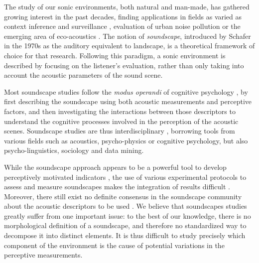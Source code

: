 \documentclass[twoside,twocolumn]{article}
\begin{document}




The study of our sonic environments, both natural and man-made, has gathered growing interest in the past decades, finding applications in fields as varied as context inference and surveillance \cite{heittola13,1540194,park14}, evaluation of urban noise pollution \cite{raimbault_urban_2005} or the emerging area of eco-acoustics \cite{ECOACOUSTICS2014, krause}. The notion of \emph{soundscape}, introduced by Schafer \cite{schafer_new_1969, schafer1977tuning} in the 1970s as the auditory equivalent to landscape, is a theoretical framework of choice for that research. Following this paradigm, a sonic environment is described by focusing on the listener's evaluation, rather than only taking into account the acoustic parameters of the sound scene. 

Most soundscape studies follow the \emph{modus operandi} of cognitive psychology \cite{maffiolo_caracterisation_1999}, by first describing the soundscape using both acoustic measurements and perceptive factors, and then investigating the interactions between those descriptors to understand the cognitive processes involved in the perception of the acoustic scenes. Soundscape studies are thus interdisciplinary \cite{davies_perception_2013, aletta2016soundscape}, borrowing tools from various fields such as acoustics, psycho-physics or cognitive psychology, but also psycho-linguistics, sociology and data mining. 

While the soundscape approach appears to be a powerful tool to develop perceptively motivated indicators \cite{schulte-fortkamp_soundscape:_2007}, the use of various experimental protocols to assess and measure soundscapes makes the integration of results difficult \cite{davies_perception_2013}. Moreover, there still exist no definite consensus in the soundscape community about the acoustic descriptors to be used \cite{aletta2016soundscape}. We believe that soundscapes studies greatly suffer from one important issue: to the best of our knowledge, there is no morphological definition of a soundscape, and therefore no standardized way to decompose it into distinct elements. It is thus difficult to study precisely which component of the environment is the cause of potential variations in the perceptive measurements.
\end{document}
